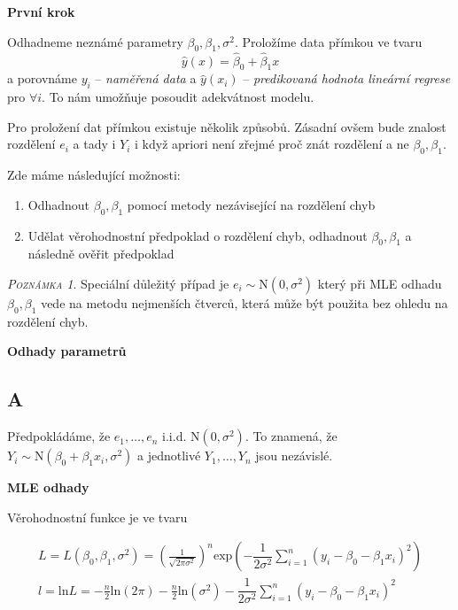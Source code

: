 \documentclass[oneside,intlimits,reqno]{scrbook}
\theoremstyle{definition}
\theoremstyle{plain}
\theoremstyle{remark}
\newtheorem{remark}[define]{\textsc{Poznámka}}
\begin{document}
\textbf{První krok }

Odhadneme neznámé parametry $ \beta_{0}, \beta_{1}, \sigma^{2} $. Proložíme data přímkou ve tvaru
\begin{equation}\label{eq:lin_reg_model}
	\widehat{y}(x) = \widehat{\beta}_{0} + \widehat{\beta}_{1} x 
\end{equation}
a porovnáme $ y_{i} $ -- \textit{naměřená data} a $ \widehat{y}(x_{i}) $ -- \textit{predikovaná hodnota lineární regrese} pro $ \forall i $. To nám umožňuje posoudit adekvátnost modelu.

Pro proložení dat přímkou existuje několik způsobů. Zásadní ovšem bude znalost rozdělení $ e_{i} $ a tady i $ Y_{i} $ i když apriori není zřejmé proč znát rozdělení a ne $ \beta_{0}, \beta_{1} $.

Zde máme následující možnosti:

\begin{enumerate}
  \item Odhadnout $ \beta_{0} , \beta_{1} $ pomocí metody nezávisející na rozdělení chyb
  \item Udělat věrohodnostní předpoklad o rozdělení chyb, odhadnout $ \beta_{0} , \beta_{1} $ a následně ověřit předpoklad
\end{enumerate}


\begin{remark}
 Speciální důležitý případ je $ e_{i} \sim \text{N}(0,\sigma^{2}) $ který při MLE odhadu $ \beta_{0}, \beta_{1} $ vede na metodu nejmenších čtverců, která může být použita bez ohledu na rozdělení chyb.
\end{remark}

\textbf{Odhady parametrů}
\subsection{A}
Předpokládáme, že $ e_{1}, \dots , e_{n} $ i.i.d. $ \text{N}(0,\sigma^{2}) $. To znamená, že $ Y_{i} \sim \text{N}(\beta_{0} + \beta_{1} x_{i},\sigma^{2}) $ a jednotlivé $ Y_{1}, \dots , Y_{n} $ jsou nezávislé.

\textbf{MLE odhady}

Věrohodnostní funkce je ve tvaru

\begin{equation}
\begin{aligned}
	L = L ( \beta_{0} , \beta_{1} , \sigma^{2} ) = \left( \frac{1}{ \sqrt{ 2 \pi \sigma^{2} }} \right) ^{n} \text{exp} \left( - \dfrac{1}{2 \sigma^{2} } \sum_{i = 1}^{n}( y_{i} -  \beta_{0}  - \beta_{1} x_{i} )^{2} \right) \\
l = \text{ln} L = -\frac{n}{2} \text{ln} ( 2 \pi ) -\frac{n}{2} \text{ln} (\sigma^{2} ) - \dfrac{1}{2 \sigma^{2} } \sum_{i = 1}^{n}( y_{i} -  \beta_{0}  - \beta_{1} x_{i})^{2}
\end{aligned}
\end{equation}
\end{document}
